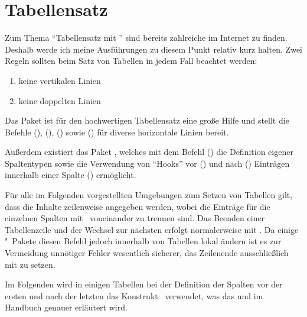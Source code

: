 \documentclass[%
  english,ngerman,%
  cdgeometry=no,DIV=12,%
  automark,%
  listof=toc,%
]{tudscrartcl}
\begin{document}
\section{Tabellensatz}
\label{sec:tables}%
%
Zum Thema \enquote{Tabellensatz mit } sind bereits zahlreiche 
\cite{reichert2012} im Internet zu finden. Deshalb werde ich meine Ausführungen 
zu diesem Punkt relativ kurz halten. Zwei Regeln sollten beim Satz von Tabellen 
in jedem Fall beachtet werden:
%
\begin{enumerate}[%
  itemindent=0pt,noitemsep,%
  labelwidth=*,labelsep=1em,label=\Roman*.%
]
\item keine vertikalen Linien
\item keine doppelten Linien
\end{enumerate}
%
Das Paket  ist für den hochwertigen Tabellensatz eine große 
Hilfe und stellt die Befehle (), 
(), () 
sowie () für diverse horizontale Linien 
bereit.
%
\begin{Preamble}
\usepackage{booktabs}
\end{Preamble}
%
Außerdem existiert das Paket , welches mit dem Befehl 
() die Definition eigener Spaltentypen 
sowie die Verwendung von \enquote{Hooks} vor (\PValue{>\PParameter{\dots}}) und 
nach (\PValue{<\PParameter{\dots}}) Einträgen innerhalb einer Spalte 
(\PValue{>\PParameter{\dots}}\PValue{<\PParameter{\dots}}) 
ermöglicht.
%
\begin{Preamble}
\usepackage{array}
\end{Preamble}
%
Für alle im Folgenden vorgestellten Umgebungen zum Setzen von Tabellen gilt, 
dass die Inhalte zeilenweise angegeben werden, wobei die Einträge für die 
einzelnen Spalten mit~\PValue{\&} voneinander zu trennen sind. Das Beenden 
einer Tabellenzeile und der Wechsel zur nächsten erfolgt normalerweise mit 
\PValue{\textbackslash\textbackslash}. Da einige "~Pakete 
diesen Befehl jedoch innerhalb von Tabellen lokal ändern ist es zur Vermeidung 
unnötiger Fehler wesentlich sicherer, das Zeilenende ausschließlich mit 
 zu setzen.

Im Folgenden wird in einigen Tabellen bei der Definition der Spalten vor der 
ersten und nach der letzten das Konstrukt~ verwendet, 
was das  
und im Handbuch genauer erläutert wird. 
\end{document}
